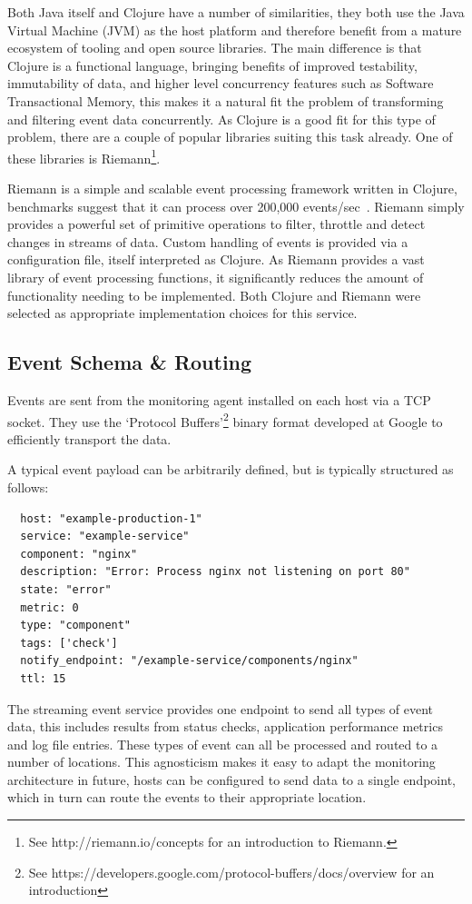 \documentclass{cshonours}
\begin{document}
Both Java itself and Clojure have a number of similarities, they both use the Java Virtual Machine (JVM) as the host platform and therefore benefit from a mature ecosystem of tooling and open source libraries. The main difference is that Clojure is a functional language, bringing benefits of improved testability, immutability of data, and higher level concurrency features such as Software Transactional Memory, this makes it a natural fit the problem of transforming and filtering event data concurrently. As Clojure is a good fit for this type of problem, there are a couple of popular libraries suiting this task already. One of these libraries is Riemann\footnote{See http://riemann.io/concepts for an introduction to Riemann.}.

Riemann is a simple and scalable event processing framework written in Clojure, benchmarks suggest that it can process over 200,000 events/sec~\cite{Aphyr200k}. Riemann simply provides a powerful set of primitive operations to filter, throttle and detect changes in streams of data. Custom handling of events is provided via a configuration file, itself interpreted as Clojure. As Riemann provides a vast library of event processing functions, it significantly reduces the amount of functionality needing to be implemented. Both Clojure and Riemann were selected as appropriate implementation choices for this service.

\subsection{Event Schema \& Routing}

Events are sent from the monitoring agent installed on each host via a TCP socket. They use the `Protocol Buffers'\footnote{See https://developers.google.com/protocol-buffers/docs/overview for an introduction} binary format developed at Google to efficiently transport the data.

A typical event payload can be arbitrarily defined, but is typically structured as follows:

\label{eventschema}
\begin{verbatim}
  host: "example-production-1"
  service: "example-service"
  component: "nginx"
  description: "Error: Process nginx not listening on port 80"
  state: "error"
  metric: 0
  type: "component"
  tags: ['check']
  notify_endpoint: "/example-service/components/nginx"
  ttl: 15
\end{verbatim}

The streaming event service provides one endpoint to send all types of event data, this includes results from status checks, application performance metrics and log file entries. These types of event can all be processed and routed to a number of locations. This agnosticism makes it easy to adapt the monitoring architecture in future, hosts can be configured to send data to a single endpoint, which in turn can route the events to their appropriate location.
\end{document}
